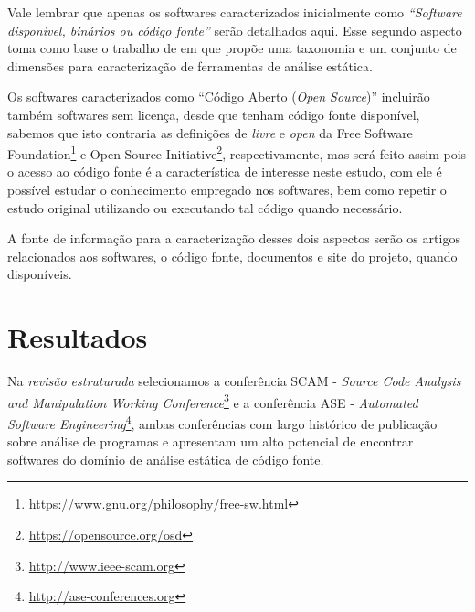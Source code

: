 Vale lembrar que apenas os softwares caracterizados inicialmente como
{\it``Software disponivel, binários ou código fonte''} serão detalhados aqui.
Esse segundo aspecto toma como base o trabalho de  em que
propõe uma taxonomia e um conjunto de dimensões para caracterização de
ferramentas de análise estática.

Os softwares caracterizados como ``Código Aberto ({\it Open Source})''
incluirão também softwares sem licença, desde que tenham código fonte
disponível, sabemos que isto contraria as definições de {\it livre} e
{\it open} da Free Software
Foundation\footnote{\url{https://www.gnu.org/philosophy/free-sw.html}} e Open
Source Initiative\footnote{\url{https://opensource.org/osd}}, respectivamente,
mas será feito assim pois o acesso ao código fonte é a característica
de interesse neste estudo, com ele é possível estudar o
conhecimento empregado nos softwares, bem como repetir o estudo original
utilizando ou executando tal código quando necessário.

%
%

A fonte de informação para a caracterização desses dois aspectos serão os
artigos relacionados aos softwares, o código fonte, documentos e site do
projeto, quando disponíveis.

\section{Resultados}

Na {\it revisão estruturada} selecionamos a conferência SCAM - {\it
Source Code Analysis and Manipulation Working
Conference}\footnote{\url{http://www.ieee-scam.org}} e a conferência ASE - {\it
Automated Software Engineering}\footnote{\url{http://ase-conferences.org}},
ambas conferências com largo histórico de publicação sobre análise de
programas e apresentam um alto potencial de encontrar softwares do domínio de
análise estática de código fonte.

